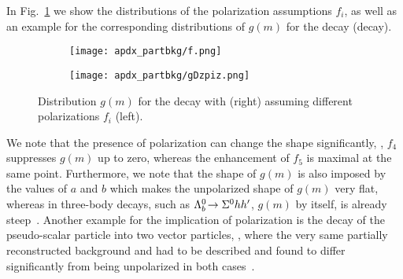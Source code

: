 In Fig.~\ref{fig:apdx_partbkg_pols} we show the distributions of the polarization assumptions $f_i$, as well as an example for the corresponding distributions of $g(m)$ for the decay \decay{\Dstarz}{\Dz\piz} (\Lb decay).
\begin{figure}[htbp]
    \centering
    \begin{subfigure}{.49\textwidth}
        \centering
        \texttt{[image: apdx\_partbkg/f.png]}
    \end{subfigure}
    \begin{subfigure}{.49\textwidth}
        \centering
        \texttt{[image: apdx\_partbkg/gDzpiz.png]}
    \end{subfigure}
    \caption{Distribution $g(m)$ for the decay \decay{\Lb}{\Dstarz\Lz} with \decay{\Dstarz}{\Dz\piz} (right) assuming different polarizations $f_i$ (left).}
    \label{fig:apdx_partbkg_pols}
\end{figure}
We note that the presence of polarization can change the shape significantly, \eg{}, $f_4$ suppresses $g(m)$ up to zero, whereas the enhancement of $f_5$ is maximal at the same point.
Furthermore, we note that the shape of $g(m)$ is also imposed by the values of $a$ and $b$ which makes the unpolarized shape of $g(m)$ very flat, whereas in three-body decays, such as ${{\Lambda}^0_{b}}\!\rightarrow {\ensuremath{{\Sigma}^0}}hh'$, $g(m)$ by itself, is already steep~\cite{LbToLzhh}.
Another example for the implication of polarization is the decay of the pseudo-scalar particle \Bd into two vector particles, \decay{\Bd}{\PD\Kstarz}, where the very same partially reconstructed background \decay{\Dstarz}{\Dz\piz} and \decay{\Dstarz}{\Dz\Pgamma} had to be described and found to differ significantly from being unpolarized in both cases~\cite{BdToDzKstar}.

